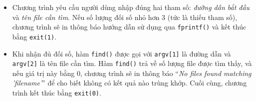 \begin{itemize}
    \item Chương trình yêu cầu người dùng nhập đúng hai tham số: \textit{đường dẫn bắt đầu} và \textit{tên file cần tìm}. Nếu số lượng đối số nhỏ hơn 3 (tức là thiếu tham số), chương trình sẽ in thông báo hướng dẫn sử dụng qua \texttt{fprintf()} và kết thúc bằng \texttt{exit(1)}. 
    \item Khi nhận đủ đối số, hàm \texttt{find()} được gọi với \texttt{argv[1]} là đường dẫn và \texttt{argv[2]} là tên file cần tìm. Hàm \texttt{find()} trả về số lượng file được tìm thấy, và nếu giá trị này bằng 0, chương trình sẽ in thông báo “\textit{No files found matching 'filename'}” để cho biết không có kết quả nào trùng khớp. Cuối cùng, chương trình kết thúc bằng \texttt{exit(0)}.
\end{itemize}




